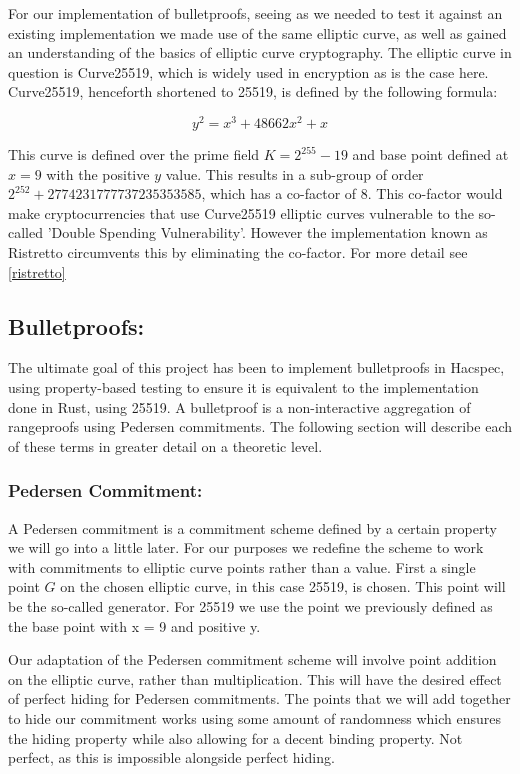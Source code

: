 \documentclass{article}
\begin{document}
For our implementation of bulletproofs, seeing as we needed to test it
against an existing implementation we made use of the same elliptic
curve, as well as gained an understanding of the basics of elliptic
curve cryptography. The elliptic curve in question is Curve25519, which
is widely used in encryption as is the case here. Curve25519, henceforth
shortened to 25519, is defined by the following formula:

$$y^2 = x^3 + 48662x^2 + x$$

This curve is defined over the prime field $K = 2^{255} - 19$ and base
point defined at $x = 9$ with the positive $y$ value. This results in a
sub-group of order $2^{252} + 2774231777737235353585$, which has a
co-factor of $8$. This co-factor would make cryptocurrencies that use
Curve25519 elliptic curves vulnerable to the so-called 'Double Spending
Vulnerability'. However the implementation known as Ristretto circumvents
this by eliminating the co-factor. For more detail see \ref{ristretto}

\subsection{Bulletproofs:}\label{Bulletproofs}

The ultimate goal of this project has been to implement bulletproofs in
Hacspec, using property-based testing to ensure it is equivalent to the
implementation done in Rust, using 25519. A bulletproof is a
non-interactive aggregation of rangeproofs using Pedersen commitments.
The following section will describe each of these terms in greater detail
on a theoretic level.

\subsubsection{Pedersen Commitment:}

A Pedersen commitment is a commitment scheme defined by a certain
property we will go into a little later. For our purposes we redefine
the scheme to work with commitments to elliptic curve points rather than
a value. First a single point $G$ on the chosen elliptic curve, in this
case 25519, is chosen. This point will be the so-called generator. For 25519 we use the point
we previously defined as the base point with x = 9 and positive y. 

Our adaptation of the Pedersen commitment scheme will involve point
addition on the elliptic curve, rather than multiplication. This will
have the desired effect of perfect hiding for Pedersen commitments. The
points that we will add together to hide our commitment works using some
amount of randomness which ensures the hiding property while also
allowing for a decent binding property. Not perfect, as this is impossible
alongside perfect hiding. 
\end{document}
